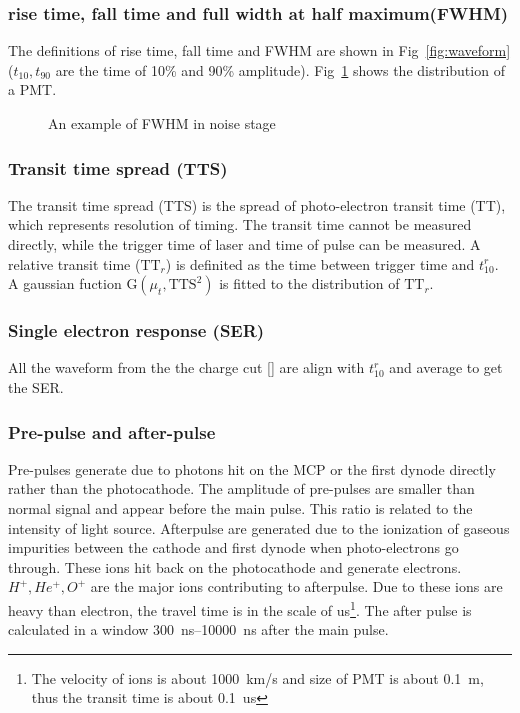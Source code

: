 \subsubsection{rise time, fall time and full width at half maximum(FWHM)}
The definitions of rise time, fall time and FWHM are shown in Fig~\ref{fig:waveform}($t_{10}, t_{90}$ are the time of 10\% and 90\% amplitude). Fig~\ref{fig:FWHM} shows the distribution of a PMT.
\begin{figure}
    \caption{An example of FWHM in noise stage}
    \label{fig:FWHM}
\end{figure}
\subsubsection{Transit time spread (TTS)}
The transit time spread (TTS) is the spread of photo-electron transit time (TT), which represents resolution of timing. The transit time cannot be measured directly, while the trigger time of laser and time of pulse can be measured. A relative transit time ($\mathrm{TT}_r$) is definited as the time between trigger time and $t_{10}^r$. A gaussian fuction G$(\mu_t,\mathrm{TTS}^2)$ is fitted to the distribution of $\mathrm{TT}_r$.
\subsubsection{Single electron response (SER)}
All the waveform from the the charge cut [] are align with $t_{10}^r$ and average to get the SER.
\subsubsection{Pre-pulse and after-pulse}
Pre-pulses generate due to photons hit on the MCP or the first dynode directly rather than the photocathode\cite{JUNOMassTesting}. The amplitude of pre-pulses are smaller than normal signal and appear before the main pulse. This ratio is related to the intensity of light source.
Afterpulse are generated due to the ionization of gaseous impurities between the cathode and first dynode when photo-electrons go through\cite{Coates_1973}. These ions hit back on the photocathode and generate electrons. $H^+,He^+,O^+$ are the major ions contributing to afterpulse\cite{Coates_1973}. Due to these ions are heavy than electron, the travel time is in the scale of \si{us}\footnote{The velocity of ions is about \SI{1000}{km/s} and size of PMT is about \SI{0.1}{m}, thus the transit time is about \SI{0.1}{us}}. The after pulse is calculated in a window \SIrange{300}{10000}{ns} after the main pulse.


